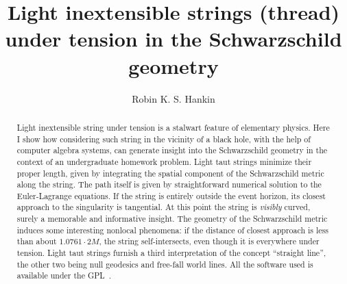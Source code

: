 \documentclass{ws-tpe}
\begin{document}

\title{Light inextensible strings (thread) under tension in the
  Schwarzschild geometry}

\author{Robin K. S. Hankin}

\address{School of Engineering, Computing, and Mathematical Sciences\\Auckland University of Technology\\55 Wellesley Street East\\
  Auckland CBD, Auckland 1010, New Zealand\\
}

\maketitle

\begin{history}
\end{history}


\begin{abstract}
Light inextensible string under tension is a stalwart feature of
elementary physics.  Here I show how considering such string in the
vicinity of a black hole, with the help of computer algebra systems,
can generate insight into the Schwarzschild geometry in the context of
an undergraduate homework problem.  Light taut strings minimize their
proper length, given by integrating the spatial component of the
Schwarzschild metric along the string.  The path itself is given by
straightforward numerical solution to the Euler-Lagrange equations.
If the string is entirely outside the event horizon, its closest
approach to the singularity is tangential.  At this point the string
is {\em visibly} curved, surely a memorable and informative insight.
The geometry of the Schwarzschild metric induces some interesting
nonlocal phenomena: if the distance of closest approach is less than
about $1.0761\cdot 2M$, the string self-intersects, even though it is
everywhere under tension.  Light taut strings furnish a third
interpretation of the concept ``straight line'', the other two being
null geodesics and free-fall world lines.  All the software used is
available under the GPL~\cite{hankin2021}.
\end{abstract}

\end{document}

